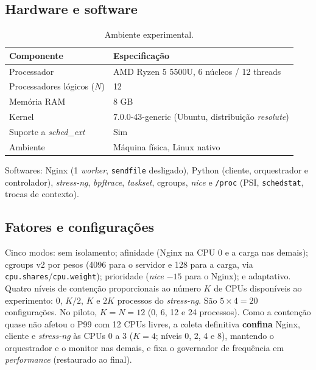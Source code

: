 \documentclass[12pt,a4paper]{article}
\begin{document}
\subsection{Hardware e software}
\begin{table}[H]
\centering
\caption{Ambiente experimental.}
\label{tab:hardware}
\begin{tabular}{ll}
\toprule
\textbf{Componente} & \textbf{Especificação} \\
\midrule
Processador & AMD Ryzen 5 5500U, 6 núcleos / 12 threads \\
Processadores lógicos ($N$) & 12 \\
Memória RAM & 8 GB \\
Kernel & 7.0.0-43-generic (Ubuntu, distribuição \textit{resolute}) \\
Suporte a \textit{sched\_ext} & Sim \\
Ambiente & Máquina física, Linux nativo \\
\bottomrule
\end{tabular}
\end{table}
Softwares: Nginx (1 \textit{worker}, \texttt{sendfile} desligado), Python (cliente, orquestrador e
controlador), \textit{stress-ng}, \textit{bpftrace}, \textit{taskset}, cgroups, \textit{nice} e
\texttt{/proc} (PSI, \texttt{schedstat}, trocas de contexto).

\subsection{Fatores e configurações}
Cinco modos: sem isolamento; afinidade (Nginx na CPU 0 e a carga nas demais); cgroups v2 por pesos (4096 para
o servidor e 128 para a carga, via \texttt{cpu.shares}/\texttt{cpu.weight}); prioridade (\textit{nice} $-15$
para o Nginx); e adaptativo. Quatro níveis de contenção proporcionais ao número $K$ de CPUs disponíveis ao experimento: 0, $K/2$, $K$ e $2K$
processos do \textit{stress-ng}. São $5\times4=20$ configurações. No piloto, $K=N=12$ (0, 6, 12 e 24 processos).
Como a contenção quase não afetou o P99 com 12 CPUs livres, a coleta definitiva \textbf{confina} Nginx, cliente e
\textit{stress-ng} às CPUs 0 a 3 ($K=4$; níveis 0, 2, 4 e 8), mantendo o orquestrador e o monitor nas demais, e
fixa o governador de frequência em \textit{performance} (restaurado ao final).
\end{document}
